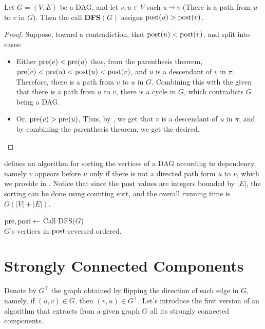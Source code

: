 \begin{claim}
  \label{claim:toposort}
  Let $G=(V,E)$ be a DAG, and let $v,u \in V$ such $u \leadsto v$ (There is a path from $u$ to $v$ in $G$). Then the call \textbf{DFS$(G)$} assigns $\text{post}(u)>\text{post}(v)$. 
\end{claim}

\begin{proof}
Suppose, toward a contradiction, that $\text{post}(u) < \text{post}(v)$, and split into cases:
  \begin{itemize}
    \item Either $\text{pre}(v) < \text{pre}(u)$ thus, from the parenthesis theorem, $\text{pre}(v) < \text{pre}(u) < \text{post}(u) < \text{post}(v)$, and $u$ is a descendant of $v$ in $\pi$. Therefore, there is a path from $v$ to $u$ in $G$. Combining this with the given that there is a path from $u$ to $v$, there is a cycle in $G$, which contradicts $G$ being a DAG.
    \item Or, $\text{pre}(v) > \text{pre}(u)$, Thus, by , we get that $v$ is a descendant of $u$ in $\pi$, and by combining the parenthesis theorem, we get the desired.
  \end{itemize}
\end{proof}

 defines an algorithm for sorting the vertices of a DAG according to dependency, namely $v$ appears before $u$ only if there is not a directed path form $u$ to $v$, which we provide in . Notice that since the $\text{post}$ values are integers bounded by $|E|$, the sorting can be done using counting sort, and the overall running time is $O(|V| + |E|)$.

  \begin{algorithm}[h]
   $\text{pre}, \text{post} \leftarrow $ Call DFS($G$)\\
   \Return $G$'s vertices in $\text{post}$-reversed ordered. 
  \caption{TopologicalSort( $G$)}
    \label{alg:topo}
  \end{algorithm}

  \section{ Strongly Connected Components }
  Denote by $G^{\top}$ the graph obtained by flipping the direction of each edge in $G$, namely, if $(u,v) \in G$, then $(v,u) \in G^{\top}$. Let's introduce the first version of an algorithm that extracts from a given graph $G$ all its strongly connected components.
  \begin{algorithm}[h]
    \caption{ Find SCCs slow version.}
    \label{alg:scc_slow}
  \end{algorithm}

